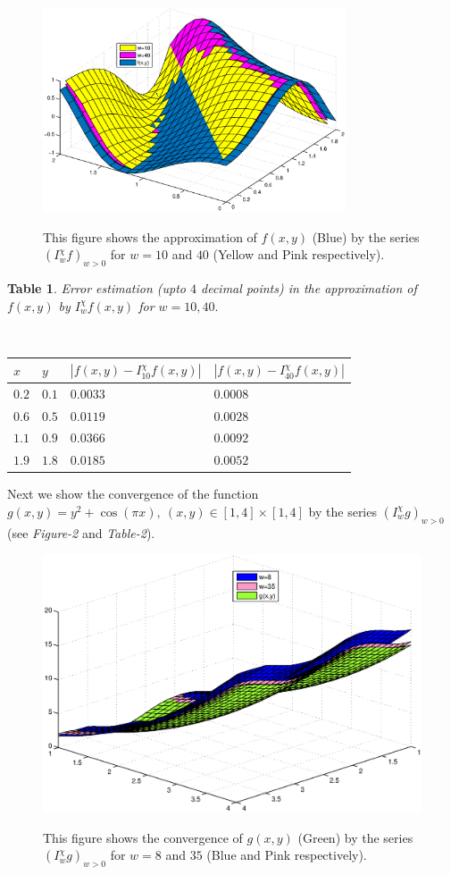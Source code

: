 \documentclass[12pt]{article}
\newtheorem{tb}{Table}
\begin{document}
{\begin{figure}[h]
\centering
{\includegraphics[width=0.8\textwidth]{figure1.eps}}
\caption{This figure shows the approximation of $f(x,y)$ (Blue) by the series $(I_{w}^{\chi}f)_{w>0}$ for $ w=10$ and $40$ (Yellow and Pink respectively).}
\end{figure}

\begin{tb}\label{table1}\centering
{\it Error estimation (upto $4$ decimal points) in the approximation of $f(x,y)$ by $I_{w}^{\chi}f(x,y)$ for $w=10,40.$}

$  $

\begin{tabular}{|l|l|l|l|}\hline
 $x$&$y$&$ |f(x,y) - I_{10}^{\chi}f(x,y)|$&$|f(x,y)-I_{40}^{\chi}f(x,y)|$\\
 \hline
 $0.2$&$0.1$ & $0.0033$ & $0.0008$\\
  \hline
 $0.6$&$0.5$ & $0.0119$ & $0.0028$ \\
  \hline
 $1.1$ &$0.9$ &$0.0366$ & $0.0092$\\
  \hline
 $1.9$ & $1.8$ & $0.0185$ & $0.0052$  \\
 \hline
             \end{tabular}
   \end{tb}

Next we show the convergence of the function $g(x,y)=y^{2}+\cos(\pi x),\ (x,y)\in [1,4]\times[1,4]$ by the series $(I_{w}^{\chi}g)_{w>0}$ (see \textit{Figure-2} and \textit{Table-2}).
\begin{figure}[h]
\centering
{\includegraphics[width=0.7 \textwidth]{figure2.eps}}
\caption{This figure shows the convergence of $g(x,y)$ (Green) by the series $(I_{w}^{\chi} g)_{w>0}$ for $ w= 8$ and $35 $ (Blue and Pink respectively).}
\end{figure}

}
\end{document}
